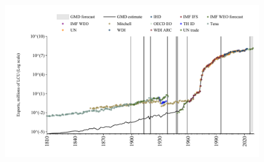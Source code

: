 \documentclass[12pt,a4paper,landscape]{article}
\begin{document}
\begin{adjustbox}{max totalsize={\paperwidth}{\paperheight},center}
\begin{minipage}[t][\textheight][t]{\textwidth}
\begin{figure}[H]
\includegraphics[width=\textwidth,height=0.6\textheight,keepaspectratio]{graphs/CHL_exports.pdf}
\end{figure}
\end{minipage}
\end{adjustbox}
\end{document}
